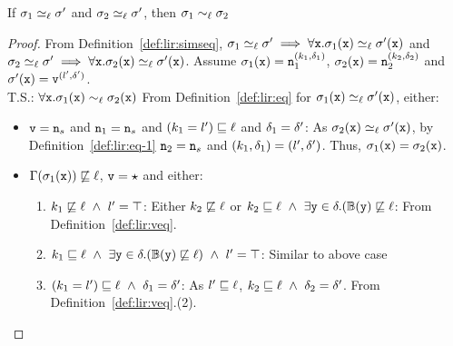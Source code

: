\begin{myLemma}
\label{lem:app:lir:sigeqproj}
If $\sigma_1 \simeq_\ell \sigma'$ and $\sigma_2 \simeq_\ell \sigma'$, then
$\sigma_1 \sim_\ell \sigma_2$ 
\end{myLemma}
\begin{proof}
From Definition~\ref{def:lir:simseq}, $\sigma_1 \simeq_\ell \sigma' \implies \forall
\texttt{x}. \sigma_1(\texttt{x}) \simeq_\ell \sigma'(\texttt{x})$ and $\sigma_2 \simeq_\ell \sigma' \implies \forall
\texttt{x}. \sigma_2(\texttt{x}) \simeq_\ell \sigma'(\texttt{x})$. Assume $\sigma_1(\texttt{x}) = \texttt{n}_1^{(k_1,
  \delta_1)}$, $\sigma_2(\texttt{x}) = \texttt{n}_2^{(k_2,
  \delta_2)}$ and $\sigma'(\texttt{x}) = \texttt{v}^{(l', \delta')}$. \\
T.S.: $\forall \texttt{x}. \sigma_1(\texttt{x}) \sim_\ell \sigma_2(\texttt{x})$ 
From Definition~\ref{def:lir:eq} for $\sigma_1(\texttt{x}) \simeq_\ell \sigma'(\texttt{x})$, either:
\begin{itemize}
\item $\texttt{v} = \texttt{n}_s$ and $\texttt{n}_1 = \texttt{n}_s$ and
  $(k_1 = l') \sqsubseteq \ell$ and $\delta_1 = \delta'$: As
  $\sigma_2(\texttt{x}) \simeq_\ell \sigma'(\texttt{x})$, by Definition~\ref{def:lir:eq-1} $\texttt{n}_2 =
  \texttt{n}_s$ and $(k_1, \delta_1) = (l', \delta')$. Thus, $\sigma_1(\texttt{x}) =
  \sigma_2(\texttt{x})$. 
\item $\Gamma(\sigma_1(\texttt{x})) \not\sqsubseteq \ell$,  $\texttt{v} = \star$
  and either:
  \begin{enumerate}
    \item $k_1 \not\sqsubseteq \ell ~\wedge ~l' = \top$: Either
      $k_2 \not\sqsubseteq \ell$ or $k_2 \sqsubseteq
      \ell~\wedge~\exists \texttt{y} \in \delta. (\mathbb{B}(\texttt{y}) \not\sqsubseteq
      \ell$: From Definition~\ref{def:lir:veq}.
    \item $k_1 \sqsubseteq \ell~\wedge~\exists \texttt{y}
      \in \delta. (\mathbb{B}(\texttt{y}) \not\sqsubseteq \ell) ~\wedge ~l' =
      \top$: Similar to above case
    \item $(k_1 = l') \sqsubseteq \ell~ \wedge
      ~\delta_1 = \delta'$: As $l' \sqsubseteq
      \ell$, $k_2 \sqsubseteq \ell~ \wedge
      ~\delta_2 = \delta'$. From Definition~\ref{def:lir:veq}.(2).
    \end{enumerate}
  \end{itemize}
\end{proof}


